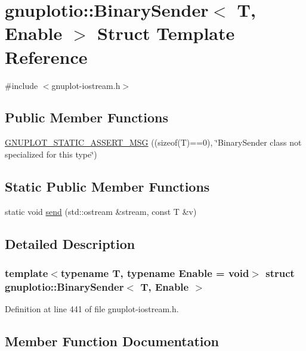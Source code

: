 \hypertarget{structgnuplotio_1_1_binary_sender}{}\section{gnuplotio\+:\+:Binary\+Sender$<$ T, Enable $>$ Struct Template Reference}
\label{structgnuplotio_1_1_binary_sender}


{\ttfamily \#include $<$gnuplot-\/iostream.\+h$>$}

\subsection*{Public Member Functions}
\begin{DoxyCompactItemize}
\item 
\hyperlink{structgnuplotio_1_1_binary_sender_ad964fa720473ff517cfb461361f645c8}{G\+N\+U\+P\+L\+O\+T\+\_\+\+S\+T\+A\+T\+I\+C\+\_\+\+A\+S\+S\+E\+R\+T\+\_\+\+M\+SG} ((sizeof(T)==0), \char`\"{}Binary\+Sender class not specialized for this type\char`\"{})
\end{DoxyCompactItemize}
\subsection*{Static Public Member Functions}
\begin{DoxyCompactItemize}
\item 
static void \hyperlink{structgnuplotio_1_1_binary_sender_a4b5dd22b7679c4f0ce4d8e75b36c8a21}{send} (std\+::ostream \&stream, const T \&v)
\end{DoxyCompactItemize}


\subsection{Detailed Description}
\subsubsection*{template$<$typename T, typename Enable = void$>$\newline
struct gnuplotio\+::\+Binary\+Sender$<$ T, Enable $>$}



Definition at line 441 of file gnuplot-\/iostream.\+h.



\subsection{Member Function Documentation}
\mbox{\label{structgnuplotio_1_1_binary_sender_ad964fa720473ff517cfb461361f645c8}} 
